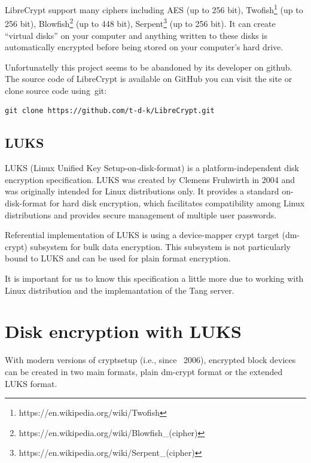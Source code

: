LibreCrypt support many ciphers including AES (up to 256 bit), Twofish\footnote{https://en.wikipedia.org/wiki/Twofish} (up to 256 bit), Blowfish\footnote{https://en.wikipedia.org/wiki/Blowfish\_(cipher)} (up to 448 bit), Serpent\footnote{https://en.wikipedia.org/wiki/Serpent\_(cipher)} (up to 256 bit)\cite{librecrypt}.
It can create “virtual disks” on your computer and anything written to these disks is automatically encrypted before being stored on your computer’s hard drive\cite{FreeOTFE}.

Unfortunatelly this project seems to be abandoned by its developer on github.
The source code of LibreCrypt is available on GitHub you can visit the site or clone source code using~git:
\begin{lstlisting}[columns=fixed,basicstyle=\ttfamily\footnotesize,tabsize=4,backgroundcolor=\color{yellow!10}]
git clone https://github.com/t-d-k/LibreCrypt.git
\end{lstlisting}



\subsection{LUKS}

LUKS (Linux Unified Key Setup-on-disk-format) is a platform-independent disk encryption specification.
LUKS was created by Clemens Fruhwirth in 2004 and was originally intended for Linux distributions only.
It provides a standard on-disk-format for hard disk encryption, which facilitates compatibility among Linux distributions and provides secure management of multiple user passwords.

Referential implementation of LUKS is using a device-mapper crypt target (dm-crypt) subsystem for bulk data encryption.
This subsystem is not particularly bound to LUKS and can be used for plain format encryption.

It is important for us to know this specification a little more due to working with Linux distribution and the implemantation of the Tang server.



\section{Disk encryption with LUKS} 

With modern versions of cryptsetup (i.e., since ~2006), encrypted block devices can be created in two main formats, plain dm-crypt format or the extended LUKS format.

